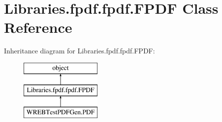\hypertarget{class_libraries_1_1fpdf_1_1fpdf_1_1_f_p_d_f}{}\section{Libraries.\+fpdf.\+fpdf.\+F\+P\+DF Class Reference}
\label{class_libraries_1_1fpdf_1_1fpdf_1_1_f_p_d_f}
Inheritance diagram for Libraries.\+fpdf.\+fpdf.\+F\+P\+DF\+:\begin{figure}[H]
\begin{center}
\leavevmode
\includegraphics[height=3.000000cm]{class_libraries_1_1fpdf_1_1fpdf_1_1_f_p_d_f}
\end{center}
\end{figure}
